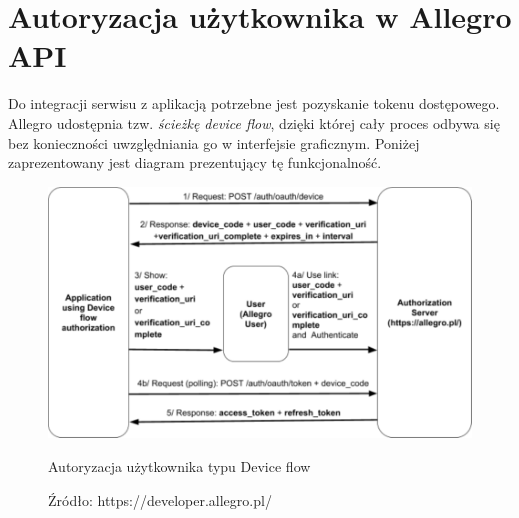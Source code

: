 
\section{Autoryzacja użytkownika w Allegro API}

Do integracji serwisu z aplikacją potrzebne jest pozyskanie tokenu dostępowego. Allegro udostępnia tzw. \textit{ścieżkę device flow}, dzięki której cały proces odbywa się bez konieczności uwzględniania go w interfejsie graficznym. Poniżej zaprezentowany jest diagram prezentujący tę funkcjonalność.

\begin{figure}[H]
	\centering
	\includegraphics[width=\linewidth]{device_flow.pdf}
	\caption{\centering Autoryzacja użytkownika typu Device flow}
	\caption*{\centering Źródło: {https://developer.allegro.pl/}}
\end{figure}

